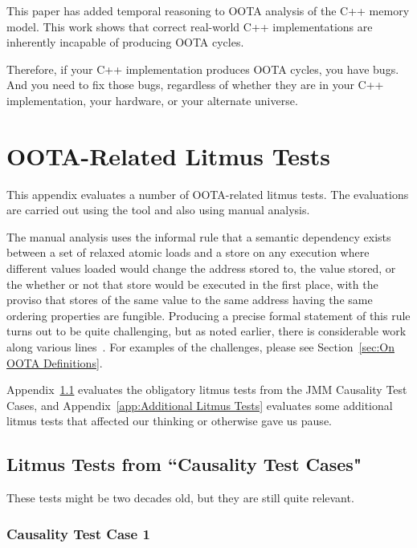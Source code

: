 \documentclass[10]{article}
\begin{document}
This paper has added temporal reasoning to OOTA analysis of the C++
memory model.
This work shows that correct real-world C++ implementations are inherently
incapable of producing OOTA cycles.

Therefore, if your C++ implementation produces OOTA cycles, you have bugs.
And you need to fix those bugs, regardless of whether they are in your
C++ implementation, your hardware, or your alternate universe.

\clearpage
\appendix

\section{OOTA-Related Litmus Tests}
\label{app:OOTA-Related Litmus Tests}

This appendix evaluates a number of OOTA-related litmus tests.
The evaluations are carried out using the  tool and also
using manual analysis.

The manual analysis uses the informal rule that a semantic dependency
exists between a set of relaxed atomic loads and a store on any execution
where different values loaded would change the address stored to, the
value stored, or the whether or not that store would be executed in
the first place, with the proviso that stores of the same value to the
same address having the same ordering properties are fungible.
Producing a precise formal statement of this rule turns out to be quite
challenging, but as noted earlier, there is considerable work along
various
lines~\cite{Lahav:2017:RSC:3062341.3062352,Sinclair:2017:CAR:3079856.3080206,Lee:10.1145/3385412.3386010,MarkBatty2019ModularRelaxedDependenciesOOTA}.
For examples of the challenges, please see
Section~\ref{sec:On OOTA Definitions}.

Appendix~\ref{app:Litmus Tests from “Causality Test Cases"}
evaluates the obligatory litmus tests from the JMM Causality Test
Cases, and
Appendix~\ref{app:Additional Litmus Tests}
evaluates some additional litmus tests that affected our thinking or
otherwise gave us pause.

\subsection{Litmus Tests from “Causality Test Cases"}
\label{app:Litmus Tests from “Causality Test Cases"}

These tests might be two decades old, but they are still quite
relevant.

\subsubsection{Causality Test Case 1}
\label{app:Causality Test Case 1}
\end{document}
